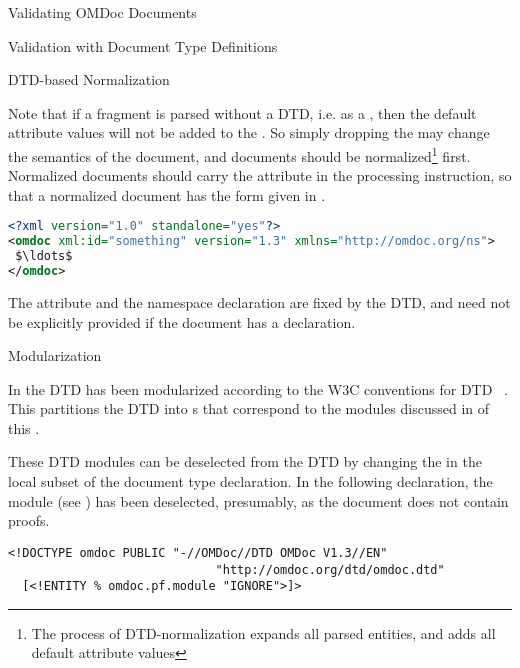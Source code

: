 \begin{tchapter}[id=validating]{Validating OMDoc Documents}
\begin{tsection}[id=validate-dtd]{Validation with Document Type Definitions}
\begin{tsubsection}[id=dtd-normalization]{DTD-based Normalization}
  
  Note that if a {\omdoc} fragment is parsed without a DTD, i.e. as a
  {} {\xml} {}, then the default attribute
  values will not be added to the {\xml}
  {}. So simply dropping the {}
  may change the semantics of the document, and {\omdoc} documents should be
  normalized\footnote{The process of DTD-normalization expands all parsed {\xml} entities,
    and adds all default attribute values} first.  Normalized
  {\omdoc} documents should carry the {} attribute in the
  {\xml} processing instruction, so that a normalized {\omdoc} document has the form given
  in {}.

\begin{lstlisting}[label=lst:normalized,language=XML,morekeywords={omdoc},mathescape,
  caption={A normalized {\omdoc} document without DTD},index={xml,omdoc}]
<?xml version="1.0" standalone="yes"?>
<omdoc xml:id="something" version="1.3" xmlns="http://omdoc.org/ns">
 $\ldots$
</omdoc>
\end{lstlisting}

The attribute {} and the namespace declaration
{} are fixed by the DTD, and need not be explicitly provided if the
document has a {} declaration.
\end{tsubsection}


\begin{tsubsection}[id=modularization]{Modularization}

  In {} the DTD has been modularized according to the W3C conventions
  for DTD {}~\cite{AltBou:mox01}. This partitions the DTD
  into  {s} that correspond to the {\omdoc} modules
  discussed in {} of this {\report}. 

  These DTD modules can be deselected from the {\omdoc} DTD by changing the
  {} in the
  local subset of the document type declaration. In the following declaration, the
  module {} (see {}) has been deselected,
  presumably, as the document does not contain proofs.

\begin{lstlisting}[index={omdoc,DOCTYPE,ENTITY,INGNORE}]
<!DOCTYPE omdoc PUBLIC "-//OMDoc//DTD OMDoc V1.3//EN"
                             "http://omdoc.org/dtd/omdoc.dtd"
  [<!ENTITY % omdoc.pf.module "IGNORE">]>
\end{lstlisting}


\end{tsubsection}
\end{tsection}
\end{tchapter}
